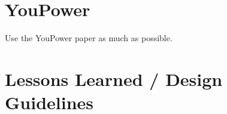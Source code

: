 \section{YouPower}
\begin{svgraybox}
Use the YouPower paper as much as possible. 
\end{svgraybox}

\section{Lessons Learned / Design Guidelines}
\begin{svgraybox}
\end{svgraybox}
